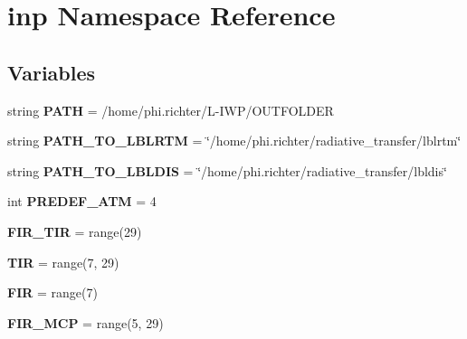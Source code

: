 \hypertarget{namespaceinp}{}\section{inp Namespace Reference}
\label{namespaceinp}
\subsection*{Variables}
\begin{DoxyCompactItemize}
\item 
\mbox{\label{namespaceinp_a8247abd0f3cd92bbdba144504c189029}} 
string {\bfseries P\+A\+TH} = \textquotesingle{}/home/phi.\+richter/L-\/I\+WP/O\+U\+T\+F\+O\+L\+D\+ER\textquotesingle{}
\item 
\mbox{\label{namespaceinp_a76e9c4b2d92abadee913ba306a23ad01}} 
string {\bfseries P\+A\+T\+H\+\_\+\+T\+O\+\_\+\+L\+B\+L\+R\+TM} = \char`\"{}/home/phi.\+richter/radiative\+\_\+transfer/lblrtm\char`\"{}
\item 
\mbox{\label{namespaceinp_af5a1466ba561026ad6823f028e8e3949}} 
string {\bfseries P\+A\+T\+H\+\_\+\+T\+O\+\_\+\+L\+B\+L\+D\+IS} = \char`\"{}/home/phi.\+richter/radiative\+\_\+transfer/lbldis\char`\"{}
\item 
\mbox{\label{namespaceinp_a9215ccbf02317c53ce1cb0c7f62cd3a6}} 
int {\bfseries P\+R\+E\+D\+E\+F\+\_\+\+A\+TM} = 4
\item 
\mbox{\label{namespaceinp_ad0fceeb520c95ec492e1633af98360a8}} 
{\bfseries F\+I\+R\+\_\+\+T\+IR} = range(29)
\item 
\mbox{\label{namespaceinp_ac003aabbdd11e62d60dd5579c5773aa7}} 
{\bfseries T\+IR} = range(7, 29)
\item 
\mbox{\label{namespaceinp_a07641bf813c061f8b2ed411096318536}} 
{\bfseries F\+IR} = range(7)
\item 
\mbox{\label{namespaceinp_a9bf37c160ea125edf055e7f6ea93c607}} 
{\bfseries F\+I\+R\+\_\+\+M\+CP} = range(5, 29)
\item 
\mbox{\label{namespaceinp_a90bf691ac7c0da29041bf7dfa4c239a4}} 

\end{DoxyCompactItemize}
